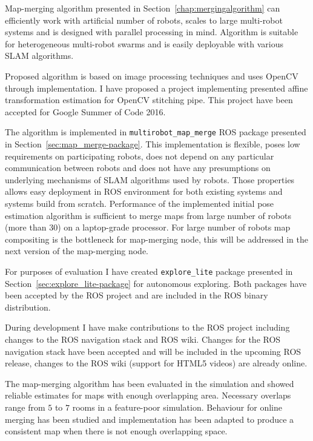 
Map-merging algorithm presented in Section~\ref{chap:mergingalgorithm} can efficiently work with artificial number of robots, scales to large multi-robot systems and is designed with parallel processing in mind. Algorithm is suitable for heterogeneous multi-robot swarms and is easily deployable with various \gls{SLAM} algorithms.

Proposed algorithm is based on image processing techniques and uses \gls{OpenCV} through implementation. I have proposed a project implementing presented affine transformation estimation for \gls{OpenCV} stitching pipe. This project have been accepted for Google Summer of Code 2016.

The algorithm is implemented in \texttt{multirobot\_map\_merge} \gls{ROS} package presented in Section~\ref{sec:map_merge-package}. This implementation is flexible, poses low requirements on participating robots, does not depend on any particular communication between robots and does not have any presumptions on underlying mechanisms of \gls{SLAM} algorithms used by robots. Those properties allows easy deployment in \gls{ROS} environment for both existing systems and systems build from scratch. Performance of the implemented initial pose estimation algorithm is sufficient to merge maps from large number of robots (more than $30$) on a laptop-grade processor. For large number of robots map compositing is the bottleneck for map-merging node, this will be addressed in the next version of the map-merging node.

For purposes of evaluation I have created \texttt{explore\_lite} package presented in Section~\ref{sec:explore_lite-package} for autonomous exploring. Both packages have been accepted by the \gls{ROS} project and are included in the \gls{ROS} binary distribution.

During development I have make contributions to the \gls{ROS} project including changes to the \gls{ROS} navigation stack and \gls{ROS} wiki. Changes for the \gls{ROS} navigation stack have been accepted and will be included in the upcoming \gls{ROS} release, changes to the \gls{ROS} wiki (support for HTML5 videos) are already online.

The map-merging algorithm has been evaluated in the simulation and showed reliable estimates for maps with enough overlapping area. Necessary overlaps range from $5$ to $7$ rooms in a feature-poor simulation. Behaviour for online merging has been studied and implementation has been adapted to produce a consistent map when there is not enough overlapping space.
